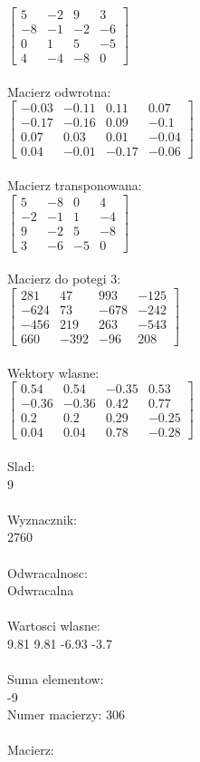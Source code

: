 \documentclass[a4paper,12pt]{article}
\begin{document}
$\begin{bmatrix} 5&-2&9&3\\-8&-1&-2&-6\\0&1&5&-5\\4&-4&-8&0 \end{bmatrix}$
\\
\\
Macierz odwrotna:\\

$\begin{bmatrix} -0.03&-0.11&0.11&0.07\\-0.17&-0.16&0.09&-0.1\\0.07&0.03&0.01&-0.04\\0.04&-0.01&-0.17&-0.06 \end{bmatrix}$
\\
\\
Macierz transponowana:\\

$\begin{bmatrix} 5&-8&0&4\\-2&-1&1&-4\\9&-2&5&-8\\3&-6&-5&0 \end{bmatrix}$
\\
\\
Macierz do potegi 3:\\

$\begin{bmatrix} 281&47&993&-125\\-624&73&-678&-242\\-456&219&263&-543\\660&-392&-96&208 \end{bmatrix}$
\\
\\
Wektory wlasne:\\

$\begin{bmatrix} 0.54&0.54&-0.35&0.53\\-0.36&-0.36&0.42&0.77\\0.2&0.2&0.29&-0.25\\0.04&0.04&0.78&-0.28 \end{bmatrix}$
\\
\\
Slad:\\
9
\\
\\
Wyznacznik:\\
2760
\\
\\
Odwracalnosc:\\
Odwracalna
\\
\\
Wartosci wlasne:\\
9.81 9.81 -6.93 -3.7
\\
\\
Suma elementow:\\
-9
\\
\newpage
Numer macierzy:
306
\\
\\
Macierz:\\
\end{document}
